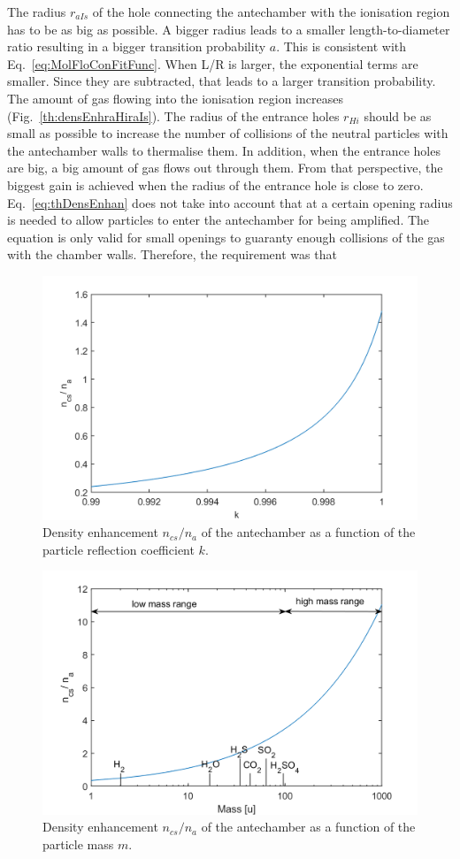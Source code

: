 	The radius $r_{aIs}$ of the hole connecting the antechamber with the ionisation region has to be as big as possible. A bigger radius leads to a smaller length-to-diameter ratio resulting in a bigger transition probability $a$. This is consistent with Eq.~\eqref{eq:MolFloConFitFunc}. When L/R is larger, the exponential terms are smaller. Since they are subtracted, that leads to a larger transition probability. The amount of gas flowing into the ionisation region increases (Fig.~\ref{th:densEnhraHiraIs}). The radius of the entrance holes $r_{Hi}$ should be as small as possible to increase the number of collisions of the neutral particles with the antechamber walls to thermalise them. In addition, when the entrance holes are big, a big amount of gas flows out through them. From that perspective, the biggest gain is achieved when the radius of the entrance hole is close to zero. Eq.~\eqref{eq:thDensEnhan} does not take into account that at a certain opening radius is needed to allow particles to enter the antechamber for being amplified. The equation is only valid for small openings to guaranty enough collisions of the gas with the chamber walls. Therefore, the requirement was that 
	\begin{figure}[H] %
		\centering
		\includegraphics[width= .7\textwidth]{Bilder/k.png}
		\caption{Density enhancement $n_{cs}/n_a$ of the antechamber as a function of the particle reflection coefficient $k$.}
		\label{th:densEnhk}
	\end{figure}
	\begin{figure}[H] %
		\centering
		\includegraphics[width= .7\textwidth]{Bilder/mV1.png}
		\caption{Density enhancement $n_{cs}/n_a$ of the antechamber as a function of the particle mass $m$.}
		\label{th:densEnhm}
	\end{figure}
